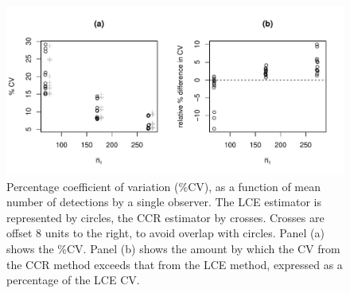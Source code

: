 \documentclass[useAMS, usenatbib, referee]{biom}\usepackage[]{graphicx}\usepackage[]{color}
\makeatletter
\def\maxwidth{ %
  \ifdim\Gin@nat@width>\linewidth
    \linewidth
  \else
    \Gin@nat@width
  \fi
}
\newenvironment{knitrout}{}{} %
\makeatother
\begin{document}
\begin{knitrout}
\color{fgcolor}\begin{figure}

{\centering \includegraphics[width=\maxwidth]{figs/fig_mlepalm_cv_bcs-1} 

}

\caption[Percentage coefficient of variation (\%CV), as a function of mean number of detections by a single observer]{Percentage coefficient of variation (\%CV), as a function of mean number of detections by a single observer. The LCE estimator is represented by circles, the CCR estimator by crosses. Crosses are offset 8 units to the right, to avoid overlap with circles. Panel (a) shows the \%CV. Panel (b) shows the amount by which the CV from the CCR method exceeds that from the LCE method, expressed as a percentage of the LCE CV.}\label{fig:fig_mlepalm_cv_bcs}
\end{figure}


\end{knitrout}
\end{document}
